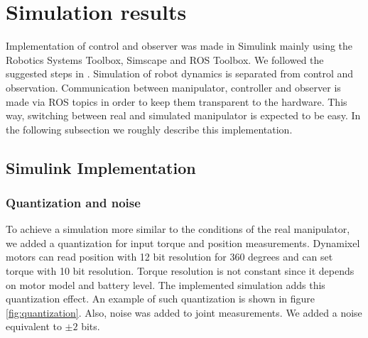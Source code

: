 \documentclass[smallextended]{svjour3}       %
\begin{document}
\section{Simulation results}
\label{sec:Results}

Implementation of control and observer was made in Simulink mainly using the Robotics Systems Toolbox, Simscape and ROS Toolbox. We followed the suggested steps in \cite{matlab_designing,matlab_trajectory}. Simulation of robot dynamics is separated from control and observation. Communication between manipulator, controller and observer is made via ROS topics in order to keep them transparent to the hardware. This way, switching between real and simulated manipulator is expected to be easy. In the following subsection we roughly describe this implementation.

\subsection{Simulink Implementation}
\subsubsection*{Quantization and noise}
To achieve a simulation more similar to the conditions of the real manipulator, we added a quantization for input torque and position measurements. Dynamixel motors can read position with 12 bit resolution for 360 degrees and can set torque with 10 bit resolution. Torque resolution is not constant since it depends on motor model and battery level. The implemented simulation adds this quantization effect. An example of such quantization is shown in figure \ref{fig:quantization}. Also, noise was added to joint measurements. We added a noise equivalent to $\pm 2$ bits. 
\end{document}
